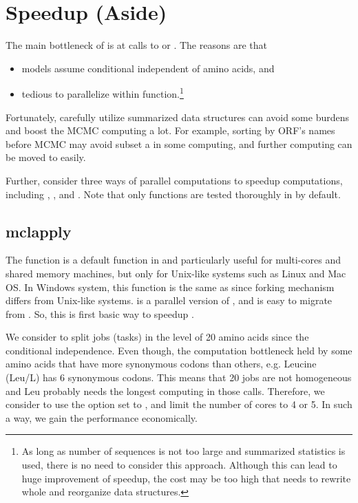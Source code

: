 
\section[Speedup (Aside)]{Speedup (Aside)}
\label{sec:speedup}

The main bottleneck of  is at calls to  or
. The reasons are that
\begin{itemize}
\item models assume conditional independent of amino acids, and
\item tedious to parallelize within  function.\footnote{
As long as number of sequences is not too large and summarized statistics is
used, there is no need to consider this approach. Although this can lead to
huge improvement of speedup, the cost may be too high that needs to rewrite
whole  and reorganize data structures.
}
\end{itemize}
Fortunately, carefully utilize summarized data structures can avoid some
burdens and boost the MCMC computing a lot. For example, sorting by ORF's
names before MCMC may avoid subset a  in some computing, and
further computing can be moved to  easily.

Further,  consider three ways of parallel computations to
speedup computations, including
, , and
. Note that only  functions are tested
thoroughly in  by default.


\subsection[mclapply]{mclapply}
\label{sec:mclapply}

The function 
is a default function in  and particularly useful for
multi-cores and shared memory machines, but only for Unix-like systems such
as Linux and Mac OS.
In Windows system, this function is the same as  since
forking mechanism differs from Unix-like systems.
 is a parallel version of , and is
easy to migrate from . So, this is first basic way to
speedup .

We consider to split jobs (tasks) in the level of 20 amino acids since the
conditional independence. Even though, the computation bottleneck held by some
amino acids that have more synonymous codons than others, e.g. Leucine (Leu/L)
has 6 synonymous codons. This means that 20 jobs are not homogeneous and Leu
probably needs the longest computing in those  calls.
Therefore, we consider to use the option  set to
, and limit the number of cores to 4 or 5. In such a way, we
gain the performance economically.

